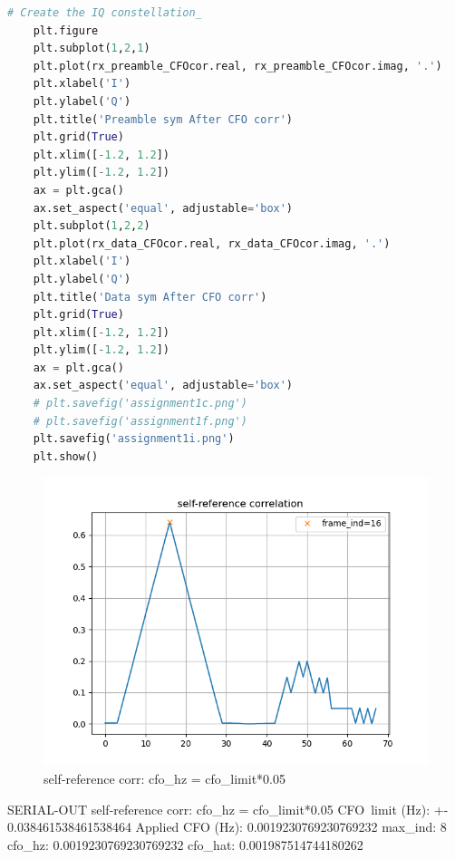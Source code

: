 \documentclass[
	letterpaper, %
	10pt, %
]{CSUniSchoolLabReport}
\begin{document}
\begin{lstlisting}[language=Python]
	# Create the IQ constellation_
	plt.figure
	plt.subplot(1,2,1)
	plt.plot(rx_preamble_CFOcor.real, rx_preamble_CFOcor.imag, '.')
	plt.xlabel('I')
	plt.ylabel('Q')
	plt.title('Preamble sym After CFO corr')
	plt.grid(True)
	plt.xlim([-1.2, 1.2])
	plt.ylim([-1.2, 1.2])
	ax = plt.gca()
	ax.set_aspect('equal', adjustable='box')
	plt.subplot(1,2,2)
	plt.plot(rx_data_CFOcor.real, rx_data_CFOcor.imag, '.')
	plt.xlabel('I')
	plt.ylabel('Q')
	plt.title('Data sym After CFO corr')
	plt.grid(True)
	plt.xlim([-1.2, 1.2])
	plt.ylim([-1.2, 1.2])
	ax = plt.gca()
	ax.set_aspect('equal', adjustable='box')
	# plt.savefig('assignment1c.png')
	# plt.savefig('assignment1f.png')
	plt.savefig('assignment1i.png')
	plt.show()
\end{lstlisting}

\begin{figure}[H] %
	\centering %
	\includegraphics[width=1.2\textwidth]{assignment1a.png} %
	\caption{self-reference corr: cfo\_hz = cfo\_limit*0.05}
	\label{fig:block}
\end{figure}
SERIAL-OUT self-reference corr: cfo\_hz = cfo\_limit*0.05\newline
CFO\ limit (Hz): +-  0.038461538461538464\newline
Applied CFO (Hz):  0.0019230769230769232\newline
max\_ind:  8\newline
cfo\_hz:  0.0019230769230769232\newline
cfo\_hat:  0.001987514744180262\newline
\end{document}
